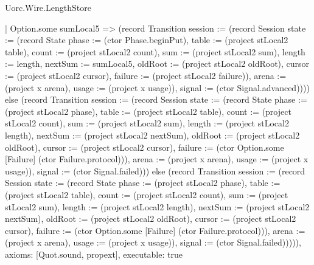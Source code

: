 \begin{lexlean}{Uorc.Wire.LengthStore}
\begin{semanticmodule}
{        | Option.some sumLocal5 => (record Transition {session := (record Session {state := (record State {phase := (ctor Phase.beginPut), table := (project stLocal2 table), count := (project stLocal2 count), sum := (project stLocal2 sum), length := length, nextSum := sumLocal5, oldRoot := (project stLocal2 oldRoot), cursor := (project stLocal2 cursor), failure := (project stLocal2 failure)}), arena := (project x arena), usage := (project x usage)}), signal := (ctor Signal.advanced)}))) else (record Transition {session := (record Session {state := (record State {phase := (project stLocal2 phase), table := (project stLocal2 table), count := (project stLocal2 count), sum := (project stLocal2 sum), length := (project stLocal2 length), nextSum := (project stLocal2 nextSum), oldRoot := (project stLocal2 oldRoot), cursor := (project stLocal2 cursor), failure := (ctor Option.some [Failure] (ctor Failure.protocol))}), arena := (project x arena), usage := (project x usage)}), signal := (ctor Signal.failed)})) else (record Transition {session := (record Session {state := (record State {phase := (project stLocal2 phase), table := (project stLocal2 table), count := (project stLocal2 count), sum := (project stLocal2 sum), length := (project stLocal2 length), nextSum := (project stLocal2 nextSum), oldRoot := (project stLocal2 oldRoot), cursor := (project stLocal2 cursor), failure := (ctor Option.some [Failure] (ctor Failure.protocol))}), arena := (project x arena), usage := (project x usage)}), signal := (ctor Signal.failed)})))),
  axioms: [Quot.sound, propext],
  executable: true
}


\end{semanticmodule}
\end{lexlean}

